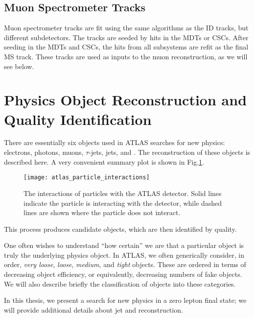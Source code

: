 \subsection{Muon Spectrometer Tracks}\label{sec:ms_tracks}

Muon spectrometer tracks are fit using the same algorithms as the ID tracks, but different subdetectors.
The tracks are seeded by hits in the MDTs or CSCs.
After seeding in the MDTs and CSCs, the hits from all subsystems are refit as the final MS track.
These tracks are used as inputs to the muon reconstruction, as we will see below.

\section{Physics Object Reconstruction and Quality Identification}

There are essentially six objects used in ATLAS searches for new physics: electrons, photons, muons, $\tau$-jets, jets, and \met.
The reconstruction of these objects is described here.
A very convenient summary plot is shown in Fig.\ref{fig:atlas_interactions}.
\begin{figure}
\caption{The interactions of particles with the ATLAS detector.
Solid lines indicate the particle is interacting with the detector, while dashed lines are shown where the particle does not interact.} \label{fig:atlas_interactions}
\texttt{[image: atlas\_particle\_interactions]}
\end{figure}
This process produces candidate objects, which are then identified by quality.

One often wishes to understand ``how certain'' we are that a particular object is truly the underlying physics object.
In ATLAS, we often generically consider, in order, \textit{very loose}, \textit{loose}, \textit{medium}, and \textit{tight} objects\footnotemark.
These are ordered in terms of decreasing object efficiency, or equivalently, decreasing numbers of fake objects.
We will also describe briefly the classification of objects into these categories.

In this thesis, we present a search for new physics in a zero lepton final state; we will provide additional details about jet and \met reconstruction.

